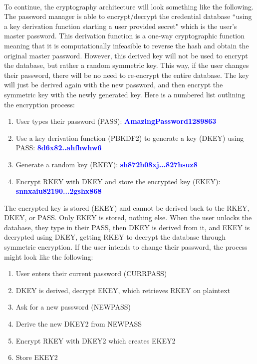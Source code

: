 \documentclass[10pt,twocolumn]{article}
\begin{document}
\paragraph{}
To continue, the cryptography architecture will look something like the following. The password manager is able to encrypt/decrypt the credential database ``using a key derivation function starting a user provided secret" \cite{li2014emperor} which is the user's master password. This derivation function is a one-way cryptographic function meaning that it is computationally infeasible to reverse the hash and obtain the original master password. However, this derived key will not be used to encrypt the database, but rather a random symmetric key. This way, if the user changes their password, there will be no need to re-encrypt the entire database. The key will just be derived again with the new password, and then encrypt the symmetric key with the newly generated key. Here is a numbered list outlining the encryption process:
\begin{enumerate}
    \item User types their password (PASS): \textcolor{blue}{\textbf{AmazingPassword1289863}}
    \item Use a key derivation function (PBKDF2) to generate a key (DKEY) using PASS: \textcolor{blue}{\textbf{8d6x82..ahfhwhw6}}
    \item Generate a random key (RKEY): \textcolor{blue}{\textbf{sh872h08xj...827hsuz8}}
    \item Encrypt RKEY with DKEY and store the encrypted key (EKEY): \textcolor{blue}{\textbf{snnxaiu82190...2gshx868}}
\end{enumerate}
The encrypted key is stored (EKEY) and cannot be derived back to the RKEY, DKEY, or PASS. Only EKEY is stored, nothing else. When the user unlocks the database, they type in their PASS, then DKEY is derived from it, and EKEY is decrypted using DKEY, getting RKEY to decrypt the database through symmetric encryption. If the user intends to change their password, the process might look like the following:
\begin{enumerate}
    \item User enters their current password (CURRPASS)
    \item DKEY is derived, decrypt EKEY, which retrieves RKEY on plaintext
    \item Ask for a new password (NEWPASS)
    \item Derive the new DKEY2 from NEWPASS
    \item Encrypt RKEY with DKEY2 which creates EKEY2
    \item Store EKEY2
\end{enumerate}
\end{document}
